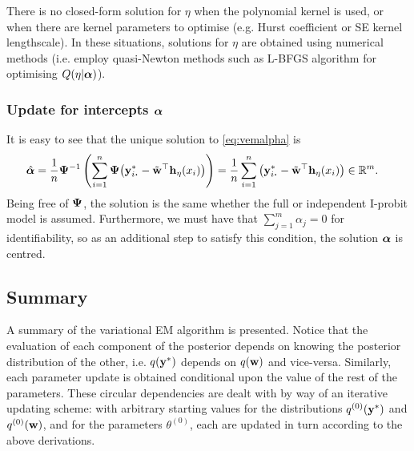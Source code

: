 \begin{remark}
  There is no closed-form solution for $\eta$ when the polynomial kernel is used, or when there are kernel parameters to optimise (e.g. Hurst coefficient or SE kernel lengthscale).
  In these situations, solutions for $\eta$ are obtained using numerical methods (i.e. employ quasi-Newton methods such as L-BFGS algorithm for optimising $Q(\eta|{\bm\alpha})$).
\end{remark}

\subsubsection{Update for intercepts \texorpdfstring{${\bm\alpha}$}{$\alpha$}}

It is easy to see that the unique solution to \cref{eq:vemalpha} is
\begin{align*}
  \hat\balpha
  &= \frac{1}{n} \bPsi^{-1} \left( \sum_{i=1}^n \bPsi \big(\by_{i\bigcdot}^* - \tilde\bw^\top\bh_\eta(x_i) \big) \right) 
  =\frac{1}{n} \sum_{i=1}^n \big(\by_{i\bigcdot}^* - \tilde\bw^\top\bh_\eta(x_i) \big) \in \bbR^m.
\end{align*}
Being free of ${\bm\Psi}$, the solution is the same whether the full or independent I-probit model is assumed.
Furthermore, we must have that $\sum_{j=1}^m \alpha_j = 0$ for identifiability, so as an additional step to satisfy this condition, the solution ${\bm\alpha}$ is centred.

\subsection{Summary}

A summary of the variational EM algorithm is presented.
Notice that the evaluation of each component of the posterior depends on knowing the posterior distribution of the other, i.e. $q({\mathbf y}^*)$ depends on $q({\mathbf w})$ and vice-versa.
Similarly, each parameter update is obtained conditional upon the value of the rest of the parameters.
These circular dependencies are dealt with by way of an iterative updating scheme: with arbitrary starting values for the distributions $q^{(0)}({\mathbf y}^*)$ and $q^{(0)}({\mathbf w})$, and for the parameters $\theta^{(0)}$, each are updated in turn according to the above derivations.

